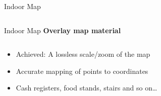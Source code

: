 \documentclass[11pt]{beamer}
\begin{document}
\begin{frame}{Indoor Map}
\begin{columns}[T]
\begin{column}{.4\textwidth}
  \end{column}
\end{columns}

\end{frame}


\begin{frame}{Indoor Map}
\textbf{Overlay map material}
  \begin{columns}[T]
  \begin{column}{.6\textwidth}
  \begin{itemize}
    \item Achieved: A lossless scale/zoom of the map
    \item Accurate mapping of points to coordinates
    \item Cash registers, food stands, stairs and so on\ldots
  \end{itemize}
  \end{column}
  \begin{column}{.4\textwidth}

\end{column}
\end{columns}
\end{frame}
\end{document}
